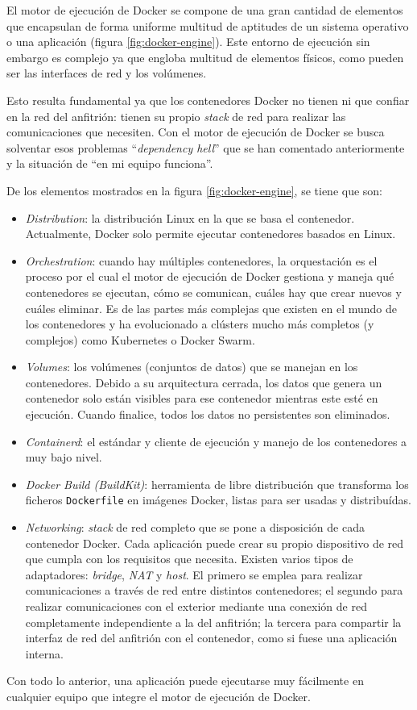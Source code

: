 El motor de ejecución de Docker se compone de una gran cantidad de elementos que
encapsulan de forma uniforme multitud de aptitudes de un sistema operativo o una
aplicación (figura \ref{fig:docker-engine}). Este entorno de ejecución sin embargo
es complejo ya que engloba multitud de elementos físicos, como pueden ser las interfaces
de red y los volúmenes.

Esto resulta fundamental ya que los contenedores Docker no tienen ni que confiar en
la red del anfitrión: tienen su propio \textit{stack} de red para realizar las comunicaciones
que necesiten. Con el motor de ejecución de Docker se busca solventar esos problemas
``\textit{dependency hell}'' que se han comentado anteriormente y la situación de ``en mi equipo
funciona''.

De los elementos mostrados en la figura \ref{fig:docker-engine}, se tiene que son:

\begin{itemize}
    \item \textit{Distribution}: la distribución Linux en la que se basa el contenedor.
          Actualmente, Docker solo permite ejecutar contenedores basados en Linux.
    \item \textit{Orchestration}: cuando hay múltiples contenedores, la orquestación
          es el proceso por el cual el motor de ejecución de Docker gestiona y
          maneja qué contenedores se ejecutan, cómo se comunican, cuáles hay que
          crear nuevos y cuáles eliminar. Es de las partes más complejas que existen
          en el mundo de los contenedores y ha evolucionado a clústers mucho más
          completos (y complejos) como Kubernetes o Docker Swarm.
    \item \textit{Volumes}: los volúmenes (conjuntos de datos) que se manejan en los
          contenedores. Debido a su arquitectura cerrada, los datos que genera un
          contenedor solo están visibles para ese contenedor mientras este esté en
          ejecución. Cuando finalice, todos los datos no persistentes son eliminados.
    \item \textit{Containerd}: el estándar y cliente de ejecución y manejo de los
          contenedores a muy bajo nivel.
    \item \textit{Docker Build (BuildKit)}: herramienta de libre distribución que
          transforma los ficheros \texttt{Dockerfile} en imágenes Docker, listas
          para ser usadas y distribuídas.
    \item \textit{Networking}: \textit{stack} de red completo que se pone a disposición
          de cada contenedor Docker. Cada aplicación puede crear su propio dispositivo
          de red que cumpla con los requisitos que necesita. Existen varios tipos de
          adaptadores: \textit{bridge}, \textit{NAT} y \textit{host}. El primero
          se emplea para realizar comunicaciones a través de red entre distintos
          contenedores; el segundo para realizar comunicaciones con el exterior
          mediante una conexión de red completamente independiente a la del anfitrión;
          la tercera para compartir la interfaz de red del anfitrión con el contenedor,
          como si fuese una aplicación interna.
\end{itemize}

Con todo lo anterior, una aplicación puede ejecutarse muy fácilmente en cualquier
equipo que integre el motor de ejecución de Docker.

